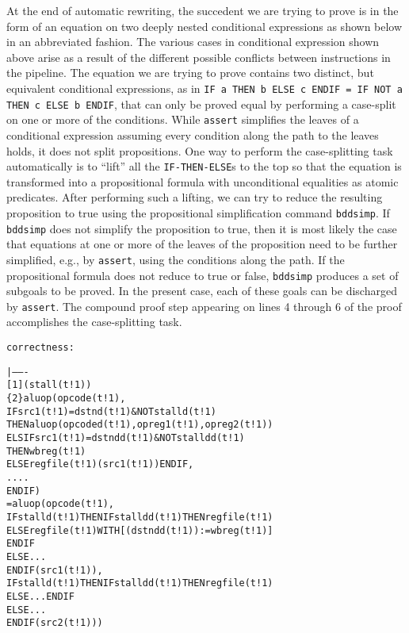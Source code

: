 At the end of automatic rewriting, the succedent we are trying to prove
is in the form of an equation on two deeply nested conditional expressions
as shown below in an abbreviated fashion.
The various cases in conditional expression shown above
arise as a result of
the different possible conflicts between instructions
in the pipeline.  The equation we are trying to prove contains
two distinct, but equivalent conditional expressions, as in
{\tt IF a THEN b ELSE c ENDIF = IF NOT a THEN c ELSE b ENDIF}, that
can only be proved equal by performing a case-split on one or more of the
conditions.  While {\tt assert} simplifies the leaves of a conditional
expression assuming every condition along the path to the leaves holds,
it does not split propositions.
One way to perform the case-splitting task automatically is
to ``lift'' all the {\tt IF-THEN-ELSE}s to the top so that the equation
is transformed into a propositional formula with unconditional equalities
as atomic predicates.
After performing such a lifting, we can try to reduce the resulting
proposition to true using the propositional simplification command
{\tt bddsimp}.  If {\tt bddsimp} does not simplify the proposition
to true, then it is most likely the case that equations at one or more
of the leaves of the proposition need to be further simplified, e.g., by
{\tt assert}, using the conditions along the path.
If the propositional formula does not reduce to true or false,
{\tt bddsimp} produces a set of subgoals to be proved.
In the present case, each of these goals can be discharged
by {\tt assert}.
The compound proof step appearing on lines 4 through 6 of the proof
accomplishes the case-splitting task.

\mbox{}

\noindent
\begin{boxedminipage}{\textwidth}
\begin{alltt}
{\smaller\smaller
correctness :   

  |-------
[1]   (stall(t!1))
\{2\}   aluop(opcode(t!1),
            IF src1(t!1) = dstnd(t!1) & NOT stalld(t!1)
              THEN aluop(opcoded(t!1), opreg1(t!1), opreg2(t!1))
            ELSIF src1(t!1) = dstndd(t!1) & NOT stalldd(t!1)
            THEN wbreg(t!1)
            ELSE regfile(t!1)(src1(t!1)) ENDIF,
            ....
            ENDIF)
        = aluop(opcode(t!1),
              IF stalld(t!1) THEN IF stalldd(t!1) THEN regfile(t!1)
                ELSE regfile(t!1) WITH [(dstndd(t!1)) := wbreg(t!1)]
                ENDIF
              ELSE ...
              ENDIF(src1(t!1)),
              IF stalld(t!1) THEN IF stalldd(t!1) THEN regfile(t!1)
                ELSE ... ENDIF
              ELSE ...
              ENDIF(src2(t!1)))
}
\end{alltt}
\end{boxedminipage}

